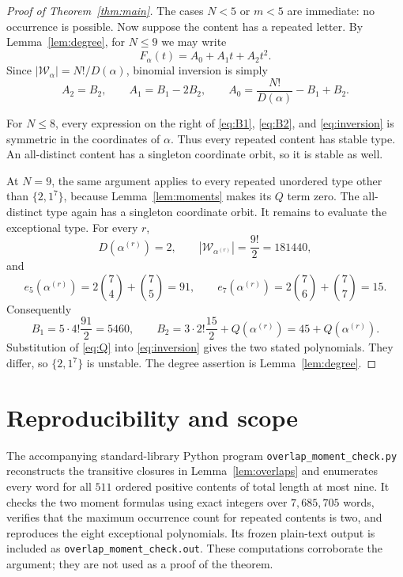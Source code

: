 \documentclass[11pt]{article}
\newcommand{\W}{\mathcal W}
\begin{document}
\begin{proof}[Proof of Theorem~\ref{thm:main}]
The cases $N<5$ or $m<5$ are immediate: no occurrence is possible.  Now
suppose the content has a repeated letter.  By Lemma~\ref{lem:degree}, for
$N\leq9$ we may write
\[
 F_\alpha(t)=A_0+A_1t+A_2t^2.
\]
Since $|\W_\alpha|=N!/D(\alpha)$, binomial inversion is simply
\begin{equation}\label{eq:inversion}
 A_2=B_2,
 \qquad A_1=B_1-2B_2,
 \qquad A_0=\frac{N!}{D(\alpha)}-B_1+B_2.
\end{equation}

For $N\leq8$, every expression on the right of
\eqref{eq:B1}, \eqref{eq:B2}, and \eqref{eq:inversion} is symmetric in the
coordinates of $\alpha$.  Thus every repeated content has stable type.  An
all-distinct content has a singleton coordinate orbit, so it is stable as
well.

At $N=9$, the same argument applies to every repeated unordered type other
than $\{2,1^7\}$, because Lemma~\ref{lem:moments} makes its $Q$ term zero.
The all-distinct type again has a singleton coordinate orbit.  It remains to
evaluate the exceptional type.  For every $r$,
\[
 D(\alpha^{(r)})=2,
 \qquad |\W_{\alpha^{(r)}}|=\frac{9!}{2}=181440,
\]
and
\[
 e_5(\alpha^{(r)})=2\binom74+\binom75=91,
 \qquad
 e_7(\alpha^{(r)})=2\binom76+\binom77=15.
\]
Consequently
\[
 B_1=5\cdot4!\frac{91}{2}=5460,
 \qquad
 B_2=3\cdot2!\frac{15}{2}+Q(\alpha^{(r)})
     =45+Q(\alpha^{(r)}).
\]
Substitution of \eqref{eq:Q} into \eqref{eq:inversion} gives the two stated
polynomials.  They differ, so $\{2,1^7\}$ is unstable.  The degree assertion
is Lemma~\ref{lem:degree}.
\end{proof}

\section{Reproducibility and scope}

The accompanying standard-library Python program
\texttt{overlap\_moment\_check.py} reconstructs the transitive closures in
Lemma~\ref{lem:overlaps} and enumerates every word for all $511$ ordered
positive contents of total length at most nine.  It checks the two moment
formulas using exact integers over $7{,}685{,}705$ words, verifies that the
maximum occurrence count for repeated contents is two, and reproduces the
eight exceptional polynomials.  Its frozen plain-text output is included as
\texttt{overlap\_moment\_check.out}.  These computations corroborate the
argument; they are not used as a proof of the theorem.
\end{document}
